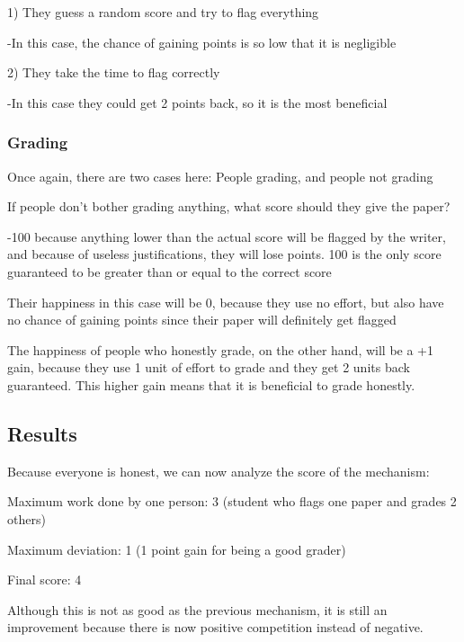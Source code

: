 \documentclass[12pt, Arial]{article}
\begin{document}
1) They guess a random score and try to flag everything

-In this case, the chance of gaining points is so low that it is negligible

2) They take the time to flag correctly

-In this case they could get 2 points back, so it is the most beneficial
\subsubsection{Grading}
Once again, there are two cases here: People grading, and people not grading

If people don't bother grading anything, what score should they give the paper?

-100 because anything lower than the actual score will be flagged by the writer, and because of useless justifications, they will lose points. 100 is the only score guaranteed to be greater than or equal to the correct score

Their happiness in this case will be 0, because they use no effort, but also have no chance of gaining points since their paper will definitely get flagged

The happiness of people who honestly grade, on the other hand, will be a +1 gain, because they use 1 unit of effort to grade and they get 2 units back guaranteed. This higher gain means that it is beneficial to grade honestly.

\subsection{Results}
Because everyone is honest, we can now analyze the score of the mechanism:

Maximum work done by one person: 3 (student who flags one paper and grades 2 others)

Maximum deviation: 1 (1 point gain for being a good grader)

Final score: 4

Although this is not as good as the previous mechanism, it is still an improvement because there is now positive competition instead of negative.
\end{document}
